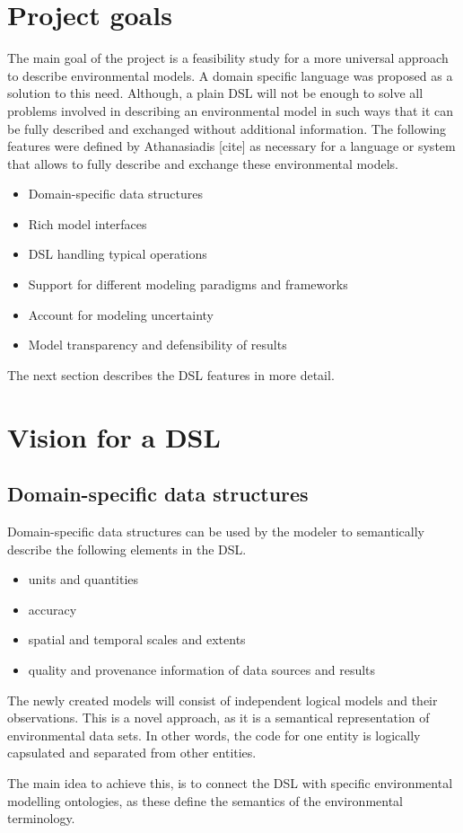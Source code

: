 \section{Project goals}
\par
The main goal of the project is a feasibility study for a more universal approach to describe environmental models. A domain specific language was proposed as a solution to this need. Although, a plain DSL will not be enough to solve all problems involved in describing an environmental model in such ways that it can be fully described and exchanged without additional information. The following features were defined by Athanasiadis [cite] as necessary for a language or system that allows to fully describe and exchange these environmental models.
\begin{itemize}
	\item Domain-specific data structures
	\item Rich model interfaces    
	\item DSL handling typical operations
	\item Support for different modeling paradigms and frameworks
	\item Account for modeling uncertainty    
	\item Model transparency and defensibility of results 
\end{itemize}
The next section describes the DSL features in more detail.

\section{Vision for a DSL} \label{sec:vision_for_a_dsl}


\subsection{Domain-specific data structures}
\par
Domain-specific data structures can be used by the modeler to semantically describe the following elements in the DSL.
\begin{itemize}
	\item    units and quantities
	\item    accuracy
	\item    spatial and temporal scales and extents
	\item    quality and provenance information of data sources and results
\end{itemize}
\par
The newly created models will consist of independent logical models and their observations. This is a novel approach, as it is a semantical representation of environmental data sets. In other words, the code for one entity is logically capsulated and separated from other entities.
\par
The main idea to achieve this, is to connect the DSL with specific environmental modelling ontologies, as these define the semantics of the environmental terminology.

